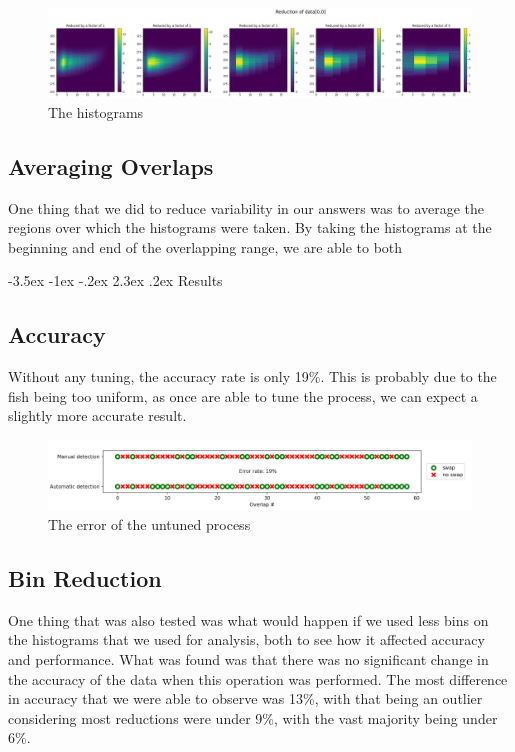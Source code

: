 \documentclass{article}
\makeatletter
\renewcommand\section{\clearpage\newpage\@startsection {section}{1}{\z@}%
	{-3.5ex \@plus -1ex \@minus -.2ex}%
	{2.3ex \@plus.2ex}%
	{\normalfont\Large\bfseries}}
\makeatother
\begin{document}
\begin{figure}[H]
	\centering
	\includegraphics[width=\linewidth]{reducedHist}
	\caption{The histograms}
	\label{fig:reducedHist}
\end{figure}

\subsection{Averaging Overlaps}

One thing that we did to reduce variability in our answers was to average the regions over which the histograms were taken. By taking the histograms at the beginning and end of the overlapping range, we are able to both 

\section{Results}

\subsection{Accuracy}

Without any tuning, the accuracy rate is only 19\%. This is probably due to the fish being too uniform, as once are able to tune the process, we can expect a slightly more accurate result.

\begin{figure}[H]
	\centering
	\includegraphics[width=\linewidth]{error}
	\caption{The error of the untuned process}
\end{figure}

\subsection{Bin Reduction}
\label{sec:binReduce}

One thing that was also tested was what would happen if we used less bins on the histograms that we used for analysis, both to see how it affected accuracy and performance. What was found was that there was no significant change in the accuracy of the data when this operation was performed. The most difference in accuracy that we were able to observe was 13\%, with that being an outlier considering most reductions were under 9\%, with the vast majority being under 6\%. 
\end{document}
